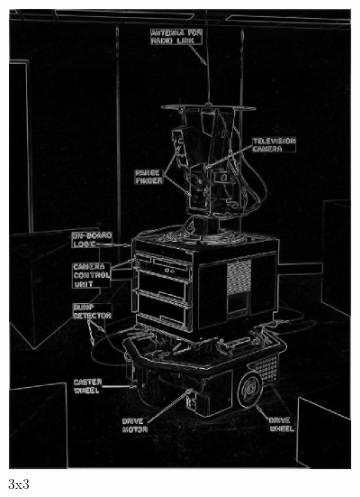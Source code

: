\documentclass[lettersize,journal]{IEEEtran}
\begin{document}
\begin{figure}[h]
\begin{subfigure}[h]{0.115\textwidth}
        \includegraphics[width=\linewidth]{gaussian_edge_map_3x3_sigma_1}
        \caption{3x3}  
    \end{subfigure}
    \begin{subfigure}[h]{0.115\textwidth}
        \centering 

\end{subfigure}
\end{figure}
\end{document}
